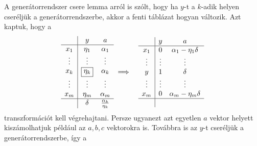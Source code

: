 \documentclass[a4paper, showtrims]{memoir}
\theoremstyle{plain}
\theoremstyle{remark}
\theoremstyle{definition}
\begin{document}
A generátorrendszer csere lemma arról is szólt, hogy ha $y$-t a $k$-adik helyen cseréljük a generátorrendszerbe,
akkor a fenti táblázat hogyan változik.
Azt kaptuk, hogy a
\begin{eqnarray}\label{alg:G-J}
	\begin{array}{c|cc}
		       & y              & a                       \\
		\hline
		x_1    & \eta_1         & \alpha_1                \\
		\vdots & \vdots         & \vdots                  \\
		x_k    & \boxed{\eta_k} & \alpha_k                \\
		\vdots & \vdots         & \vdots                  \\
		x_m    & \eta_m         & \alpha_m                \\
		\hline
		       & \delta         & \frac{\alpha_k}{\eta_k}
	\end{array}
	&\implies&
	\begin{array}{c|cc}
		       & y      & a                     \\
		\hline
		x_1    & 0      & \alpha_1-\eta_1\delta \\
		\vdots & \vdots & \vdots                \\
		y      & 1      & \delta                \\
		\vdots & \vdots & \vdots                \\
		x_m    & 0      & \alpha_m-\eta_m\delta \\
		\hline
		       &        &
	\end{array}
\end{eqnarray}
transzformációt kell végrehajtani.
Persze ugyanezt azt egyetlen $a$ vektor helyett kiszámolhatjuk például az $a,b,c$ vektorokra is.
Továbbra is az $y$-t cseréljük a generátorrendszerbe, így a
\end{document}
